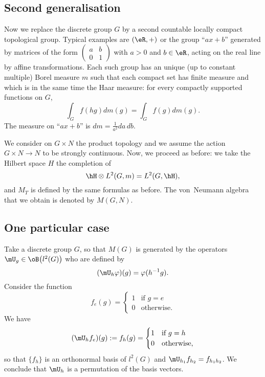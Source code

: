 					\subsection{Second generalisation}

Now we replace the discrete group $G$ by a second countable locally compact topological group. Typical examples are $(\eR,+)$ or the group ``$ax+b$'' generated by matrices of the form $\begin{pmatrix}
a&b\\0&1
\end{pmatrix}$ with $a>0$ and $b\in \eR$, acting on the real line by affine transformations. Each such group has an unique (up to constant multiple) Borel measure $m$ such that each compact set has finite measure and which is in the same time the Haar measure: for every compactly supported functions on $G$,
\[ 
  \int_G f(hg)dm(g)=\int_G f(g)dm(g).
\]
The measure on ``$ax+b$'' is $dm=\frac{1}{ a^2 }da\,db$.

We consider on $G\times N$ the product topology and we assume the action $G\times N\to N$ to be strongly continuous. Now, we proceed as before: we take the Hilbert space $H$ the completion of
\[ 
  \hH\otimes  L^2(G,m)=L^2(G,\hH),
\]
and $M_T$ is defined by the same formulas as before. The von~Neumann algebra that we obtain is denoted by $M(G,N)$.

					\subsection{One particular case}
\label{sssOnePartCaseMG}

Take a discrete group $G$, so that $M(G)$ is generated by the operators $\mU_g\in\oB\big( l^2(G) \big)$ who are defined by
\begin{equation}
		(\mU_h\varphi)(g)=\varphi(h^{-1}g).
\end{equation}
Consider the function
\begin{equation}
		f_e(g)=
\begin{cases}
1		&\text{if $g=e$}\\
0		&\text{otherwise.}
\end{cases}
\end{equation}
We have 
\[ 
  (\mU_hf_e)(g):=f_h(g)=
\begin{cases}
1		&\text{if $g=h$}\\
0		&\text{otherwise,}
\end{cases}
\]
so that $\{ f_h \}$ is an orthonormal basis of $l^2(G)$ and $\mU_{h_1}f_{h_2}=f_{h_1h_2}$. We conclude that $\mU_h$ is a permutation of the basis vectors. 

